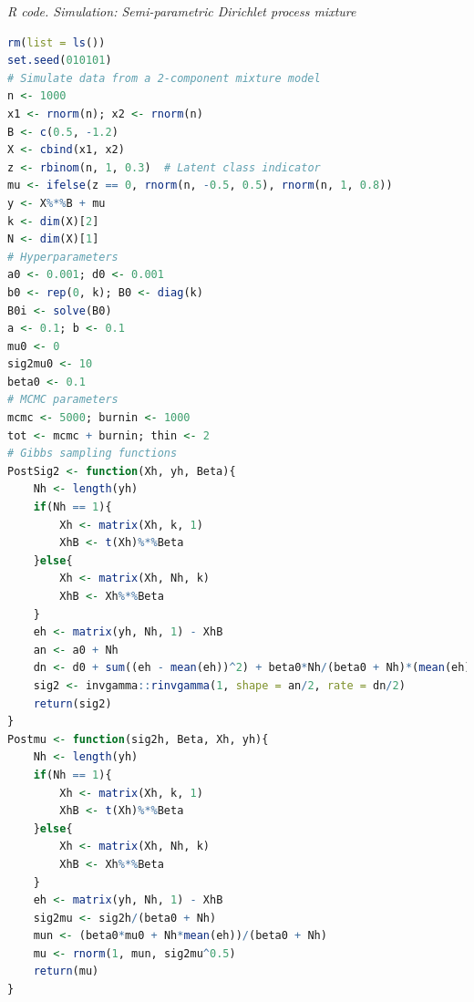 \begin{enumerate}[leftmargin=*]
\begin{tcolorbox}[enhanced,width=4.67in,center upper,
	fontupper=\large\bfseries,drop shadow southwest,sharp corners]
	\textit{R code. Simulation: Semi-parametric Dirichlet process mixture}
	\begin{VF}
		\begin{lstlisting}[language=R]
rm(list = ls())
set.seed(010101)
# Simulate data from a 2-component mixture model
n <- 1000
x1 <- rnorm(n); x2 <- rnorm(n)
B <- c(0.5, -1.2)
X <- cbind(x1, x2)
z <- rbinom(n, 1, 0.3)  # Latent class indicator
mu <- ifelse(z == 0, rnorm(n, -0.5, 0.5), rnorm(n, 1, 0.8))
y <- X%*%B + mu
k <- dim(X)[2]
N <- dim(X)[1]
# Hyperparameters
a0 <- 0.001; d0 <- 0.001
b0 <- rep(0, k); B0 <- diag(k)
B0i <- solve(B0)
a <- 0.1; b <- 0.1
mu0 <- 0
sig2mu0 <- 10
beta0 <- 0.1
# MCMC parameters
mcmc <- 5000; burnin <- 1000
tot <- mcmc + burnin; thin <- 2
# Gibbs sampling functions
PostSig2 <- function(Xh, yh, Beta){
	Nh <- length(yh)
	if(Nh == 1){
		Xh <- matrix(Xh, k, 1)
		XhB <- t(Xh)%*%Beta
	}else{
		Xh <- matrix(Xh, Nh, k)
		XhB <- Xh%*%Beta
	}
	eh <- matrix(yh, Nh, 1) - XhB
	an <- a0 + Nh
	dn <- d0 + sum((eh - mean(eh))^2) + beta0*Nh/(beta0 + Nh)*(mean(eh) - mu0)^2
	sig2 <- invgamma::rinvgamma(1, shape = an/2, rate = dn/2)
	return(sig2)
}
Postmu <- function(sig2h, Beta, Xh, yh){
	Nh <- length(yh)
	if(Nh == 1){
		Xh <- matrix(Xh, k, 1)
		XhB <- t(Xh)%*%Beta
	}else{
		Xh <- matrix(Xh, Nh, k)
		XhB <- Xh%*%Beta
	}
	eh <- matrix(yh, Nh, 1) - XhB
	sig2mu <- sig2h/(beta0 + Nh)
	mun <- (beta0*mu0 + Nh*mean(eh))/(beta0 + Nh)
	mu <- rnorm(1, mun, sig2mu^0.5)
	return(mu)
}
\end{lstlisting}
	\end{VF}
\end{tcolorbox}


\end{enumerate}
